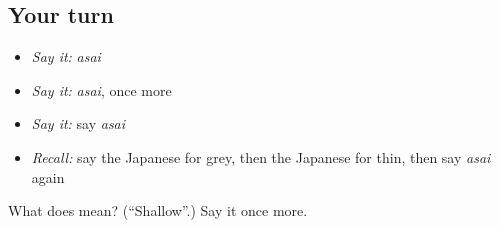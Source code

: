 \subsection*{Your turn}
\begin{itemize}
\raggedright
  \item \emph{Say it:} \emph{asai}
  \item \emph{Say it:} \emph{asai}, once more
  \item \emph{Say it:} say \emph{asai}
  \item \emph{Recall:} say the Japanese for grey, then the Japanese for thin, then say \emph{asai} again
\end{itemize}

\begin{tcolorbox}[breakable,colback=teal!4,colframe=teal!35!black,title={Before you move on}]
What does  mean? (\textquotedblleft{}Shallow\textquotedblright{}.) Say it once more.
\end{tcolorbox}
